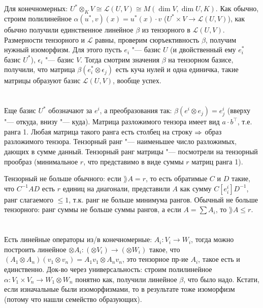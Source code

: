 \section{} %
Для конечномерных: $U^* \otimes_K V \cong \mathcal L(U, V) \cong M(\dim V, \dim U, K)$.
Как обычно, строим полилинейное $\alpha(u^*, v)(x) = u^*(x) \cdot v$ ($U^* \times V \to \mathcal L(U, V)$), как обычно получили единственное
линейное $\beta$ из тензорного в $\mathcal L (U, V)$.
Размерности тензорного и $\mathcal L$ равны, проверим сюръективность $\beta$, получим нужный изоморфизм.
Для этого пусть $e_i$ "--- базис $U$ (и двойственный ему $e_i^*$ базис $U^*$), $\epsilon_i$ "--- базис $V$.
Тогда смотрим значения $\beta$ на тензорном базисе, получили, что матрица $\beta(e_i^*\otimes \epsilon_j)$ есть куча нулей и одна единичка,
такие матрицы образуют базис $\mathcal L (U, V)$, вообще успех.

\section{} %
Еще базис $U^*$ обозначают за $e^i$, а преобразования так: $\beta(e^i\otimes e_j)=e^i_j$ (вверху "--- откуда, внизу "--- куда).
Матрица разложимого тензора имеет вид $a\cdot b^\top$, т.е. ранга 1.
Любая матрица такого ранга есть столбец на строку $\Rightarrow$ образ разложимого тензора.
Тензорный ранг "--- наименьшее число разложимых, дающих в сумме данный.
Тензорный ранг матрицы "--- посмотрели на тензорный прообраз (минимальное $r$, что представимо в виде
суммы $r$ матриц ранга 1).

Тензорный не больше обычного: если $\rang A = r$, то есть обратимые $C$ и $D$ такие, что $C^{-1}AD$ есть $r$ единиц на диагонали,
представили $A$ как сумму $C[e^i_i]D^{-1}$, ранг слагаемого $\le 1$, т.к. ранг не больше минимума рангов.
Обычный не больше тензорного: ранг суммы не больше суммы рангов, а если $A=\sum A_i$, то $\rang A \le r$.

\section{} %
Есть линейные операторы из/в конечномерные: $A_i \colon V_i \to W_i$,
тогда можно построить линейное $\otimes A_i \colon (\otimes V_i) \to (\otimes W_i)$ такое,
что $(A_1 \otimes A_n)(v_1\otimes v_n)=A_1v_1 \otimes A_n v_n$, это тензорное пр-ие $A_i$,
такое есть и единственно.
Док-во через универсальность: строим полилинейное $\alpha \colon V_1 \times V_n \to W_1 \otimes W_n$ понятно как,
получили линейное $\beta$, что было надо.
Кстати, если изначальные были изоморфизмами, то в результате тоже изоморфизм (потому что нашли семейство образующих).

